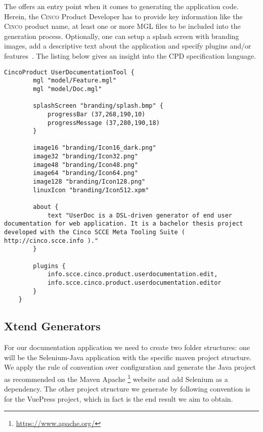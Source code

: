 The  offers an entry point when it comes to generating the application code. Herein, the \textsc{Cinco} Product Developer has to provide key information like the \textsc{Cinco} product name, at least one or more MGL files to be included into the generation process. Optionally, one can setup a splash screen with branding images, add a descriptive text about the application and specify plugins and/or features~\cite{gitlabcinco}.
The listing below gives an insight into the CPD specification language.

\begin{lstlisting}[language=MGL, caption={UserDocumentationTool.cpd}]
    CincoProduct UserDocumentationTool {
        mgl "model/Feature.mgl"
        mgl "model/Doc.mgl"
        
        splashScreen "branding/splash.bmp" {
            progressBar (37,268,190,10)
            progressMessage (37,280,190,18)
        }
    
        image16 "branding/Icon16_dark.png"
        image32 "branding/Icon32.png"
        image48 "branding/Icon48.png"
        image64 "branding/Icon64.png"
        image128 "branding/Icon128.png"
        linuxIcon "branding/Icon512.xpm"
	
        about {
            text "UserDoc is a DSL-driven generator of end user documentation for web application. It is a bachelor thesis project developed with the Cinco SCCE Meta Tooling Suite ( http://cinco.scce.info )."
        }

        plugins {
            info.scce.cinco.product.userdocumentation.edit,
            info.scce.cinco.product.userdocumentation.editor
        }
    }
\end{lstlisting}

\subsection{Xtend Generators}\label{sec:GEN}

For our documentation application we need to create two folder structures: one will be the Selenium-Java application with the specific maven project structure. We apply the rule of convention over configuration and generate the Java project as recommended on the Maven Apache \footnote[1]{\url{https://www.apache.org/}} website and add Selenium as a dependency. The other project structure we generate by following convention is for the VuePress project, which in fact is the end result we aim to obtain.

